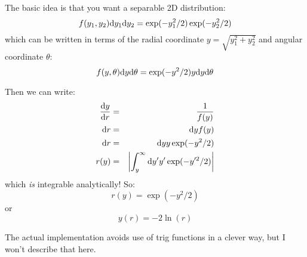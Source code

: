 The basic idea is that you want a separable 2D distribution:
\begin{equation}
f(y_1, y_2) {\rm d}y_1 {\rm d}y_2 = \exp( - y_1^2/2) \exp(- y_2^2/2)
\end{equation}
which can be written in terms of the radial coordinate $y =
\sqrt{y_1^2 + y_2^2}$ and angular coordinate $\theta$:
\begin{equation}
f(y, \theta) {\rm d}y {\rm d}\theta = 
\exp(-y^2/2) y {\rm d}y {\rm d}\theta
\end{equation}

Then we can write:
\begin{eqnarray}
\frac{{\rm d}y}{{\rm d}r} &=& \frac{1}{f(y)} \cr
{{\rm d}r} &=& {\rm d}y {f(y)} \cr
{{\rm d}r} &=& {\rm d}y y \exp(-y^2/2) \cr
r(y) &=& \left|\int_y^{\infty} {\rm d}y' y' \exp(-y'^2/2)\right|
\end{eqnarray}
which {\it is} integrable analytically! So:
\begin{equation}
r(y) = \exp(- y^2 /2)
\end{equation}
or 
\begin{equation}
y(r) = -2 \ln(r)
\end{equation}

The actual implementation avoids use of trig functions in a clever
way, but I won't describe that here.
